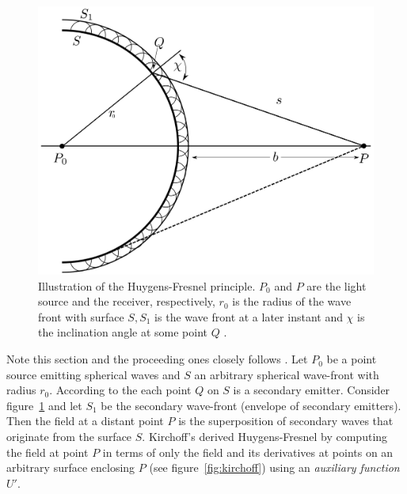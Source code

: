 \begin{figure}
    \includegraphics[width=\textwidth]{figures/appendix/huygens-fresnel.png}
    \caption{Illustration of the Huygens-Fresnel principle. \(P_0\) and \(P\) are the light source and the receiver, respectively, \(r_0\) is the
        radius of the wave front with surface \(S,S_1\) is the wave front at a later instant and \(\chi\) is the inclination angle at some point
        \(Q\) \cite{Ivanov2016ElementsOD}.}\label{fig:huygensfresnel}
\end{figure}
Note this section and the proceeding ones closely follows \cite{Ivanov2016ElementsOD}.
%
Let \(P_0\) be a point source emitting spherical waves and \(S\) an arbitrary spherical wave-front with radius \(r_0\).
%
According to the  each point \(Q\) on \(S\) is a secondary emitter.
%
Consider figure~\ref{fig:huygensfresnel} and let \(S_1\) be the secondary wave-front (envelope of secondary emitters).
%
Then the field at a distant point \(P\) is the superposition of secondary waves that originate from the surface \(S\).
%
Kirchoff's derived Huygens-Fresnel by computing the field at point \(P\) in terms of only the field
and its derivatives at points on an arbitrary surface enclosing \(P\) (see figure~\ref{fig:kirchoff}) using an \textit{auxiliary function} \(U'\).
%

